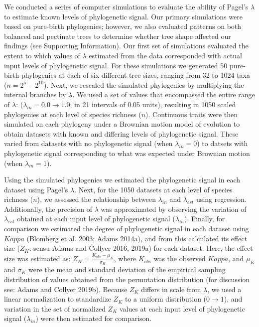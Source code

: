 \documentclass[
]{article}
\begin{document}
We conducted a series of computer simulations to evaluate the ability of
Pagel's \(\lambda\) to estimate known levels of phylogenetic signal. Our
primary simulations were based on pure-birth phylogenies; however, we
also evaluated patterns on both balanced and pectinate trees to
determine whether tree shape affected our findings (see Supporting
Information). Our first set of simulations evaluated the extent to which
values of \(\lambda\) estimated from the data corresponded with actual
input levels of phylogenetic signal. For these simulations we generated
50 pure-birth phylogenies at each of six different tree sizes, ranging
from 32 to 1024 taxa (\(n=2^5 - 2^{10}\)). Next, we rescaled the
simulated phylogenies by multiplying the internal branches by
\(\lambda\). We used a set of values that encompassed the entire range
of \(\lambda\): (\(\lambda_{in} = 0.0 \to 1.0\); in 21 intervals of 0.05
units), resulting in 1050 scaled phylogenies at each level of species
richness (\(n\)). Continuous traits were then simulated on each
phylogeny under a Brownian motion model of evolution to obtain datasets
with known and differing levels of phylogenetic signal. These varied
from datasets with no phylogenetic signal (when \(\lambda_{in} =0\)) to
datsets with phylogenetic signal corresponding to what was expected
under Brownian motion (when \(\lambda_{in} =1\)). \hfill\break

Using the simulated phylogenies we estimated the phylogenetic signal in
each dataset using Pagel's \(\lambda\). Next, for the 1050 datasets at
each level of species richness (\(n\)), we assessed the relationship
between \(\lambda_{in}\) and \(\lambda_{est}\) using regression.
Additionally, the precision of \(\lambda\) was approximated by observing
the variation of \(\lambda_{est}\) obtained at each input level of
phylogenetic signal (\(\lambda_{in}\)). Finally, for comparison we
estimated the degree of phylogenetic signal in each dataset using
\(Kappa\) (Blomberg et al. 2003; Adams 2014a), and from this calculated
its effect size (\(Z_K\): sensu Adams and Collyer 2016, 2019a) for each
dataset. Here, the effect size was estimated as:
\(Z_K=\frac{K_{obs}-\mu_K}{\sigma_K}\), where \(K_{obs}\) was the
observed \(Kappa\), and \(\mu_K\) and \(\sigma_K\) were the mean and
standard deviation of the empirical sampling distribution of values
obtained from the permutation distribution (for discussion see: Adams
and Collyer 2019b). Because \(Z_K\) differs in scale from \(\lambda\),
we used a linear normalization to standardize \(Z_K\) to a uniform
distribution (\(0\rightarrow1\)), and variation in the set of normalized
\(Z_K\) values at each input level of phylogenetic signal
(\(\lambda_{in}\)) were then estimated for comparison. \hfill\break
\end{document}
